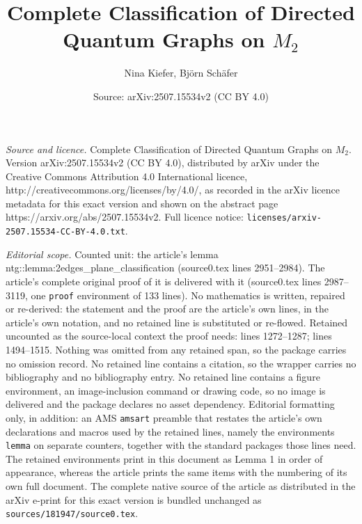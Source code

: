 \documentclass[10pt,a4paper]{amsart}
\title{Complete Classification of Directed Quantum Graphs on $M_2$}
\author{Nina Kiefer, Bj\"orn Sch\"afer}
\date{Source: arXiv:2507.15534v2 (CC BY 4.0)}
\begin{document}
\maketitle

\noindent\emph{Source and licence.} Complete Classification of Directed Quantum Graphs on $M_2$. Version arXiv:2507.15534v2 (CC BY 4.0), distributed by arXiv under the Creative Commons Attribution 4.0 International licence, http://creativecommons.org/licenses/by/4.0/, as recorded in the arXiv licence metadata for this exact version and shown on the abstract page https://arxiv.org/abs/2507.15534v2. Full licence notice: \texttt{licenses/arxiv-2507.15534-CC-BY-4.0.txt}.\par\smallskip

\noindent\textit{Editorial scope.} Counted unit: the article's lemma ntg::lemma:2edges\_plane\_classification (source0.tex lines 2951--2984). The article's complete original proof of it is delivered with it (source0.tex lines 2987--3119, one \texttt{proof} environment of 133 lines). No mathematics is written, repaired or re-derived: the statement and the proof are the article's own lines, in the article's own notation, and no retained line is substituted or re-flowed.  Retained uncounted as the source-local context the proof needs: lines 1272--1287; lines 1494--1515.  Nothing was omitted from any retained span, so the package carries no omission record.  No retained line contains a citation, so the wrapper carries no bibliography and no bibliography entry.  No retained line contains a figure environment, an image-inclusion command or drawing code, so no image is delivered and the package declares no asset dependency.  Editorial formatting only, in addition: an AMS \texttt{amsart} preamble that restates the article's own declarations and macros used by the retained lines, namely the environments \texttt{lemma} on separate counters, together with the standard packages those lines need.  The retained environments print in this document as Lemma 1 in order of appearance, whereas the article prints the same items with the numbering of its own full document.  The complete native source of the article as distributed in the arXiv e-print for this exact version is bundled unchanged as \texttt{sources/181947/source0.tex}.
\end{document}
